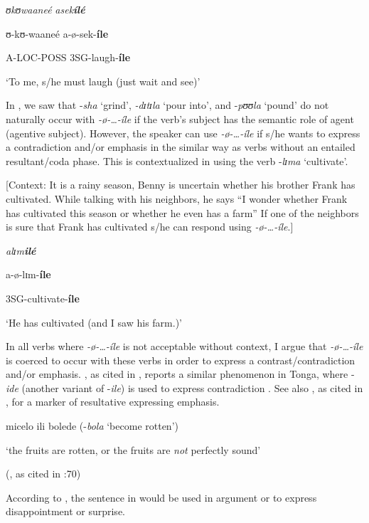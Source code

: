 \documentclass[output=paper]{langscibook}
\begin{document}
\ea
\ea
\textit{ʊk}\textit{ʊwaaneé}    \textit{asek}\textbf{\textit{ílé}}

  ʊ-kʊ-waaneé a-ø-sek-\textbf{íle}

   A-LOC-POSS  3SG-laugh-\textbf{íle}

  ‘To me, s/he must laugh (just wait and see)’
\z
\z

In , we saw that -\textit{sha} ‘grind’, \textit{-dɪ}\textit{tɪ}\textit{la} ‘pour into’, and -\textit{pʊʊ}\textit{la} ‘pound’ do not naturally occur with \textit{-ø}\textit{-…-íle} if the verb’s subject has the semantic role of agent (agentive subject). However, the speaker can use \textit{-ø}\textit{-…-íle} if s/he wants to express a contradiction and/or emphasis in the similar way as verbs without an entailed resultant/coda phase. This is contextualized in  using the verb -\textit{lɪ}\textit{ma} ‘cultivate’. 

\ea
\ea{} 
[Context: It is a rainy season, Benny is uncertain whether his brother Frank has cultivated. While talking with his neighbors, he says “I wonder whether Frank has cultivated this season or whether he even has a farm” If one of the neighbors is sure that Frank has cultivated s/he can respond using \textit{-ø}\textit{-…-íle}.]

\textit{alɪ}\textit{m}\textbf{\textit{ilé}}

a-ø-lɪm-\textbf{íle}

3SG-cultivate-\textbf{íle}

‘He has cultivated (and I saw his farm.)’
\z
\z

In all verbs where \textit{-ø}\textit{-…-íle} is not acceptable without context, I argue that \textit{-ø}\textit{-…-íle} is coerced to occur with these verbs in order to express a contrast/contradiction and/or emphasis. \citet{Collins1962}, as cited in \citet[70]{Crane2012}, reports a similar phenomenon in Tonga, where -\textit{ide} (another variant of -\textit{ile}) is used to express contradiction . See also \citet{Woidich1975}, as cited in \citet[194]{Ebert1995}, for a marker of resultative expressing emphasis. 

\ea
micelo ili bolede (-\textit{bola} ‘become rotten’)

  ‘the fruits are rotten, or the fruits are \textit{not} perfectly sound’ 


      (\citealt{Collins1962}, as cited in \citealt{Crane2012}:70)
\z

According to \citet{Collins1962}, the sentence in  would be used in argument or to express disappointment or surprise. 
\end{document}
